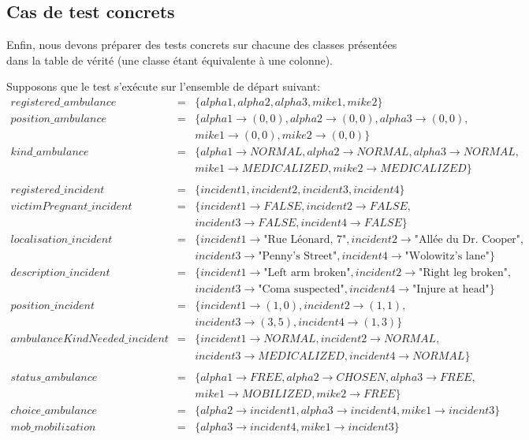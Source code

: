 \documentclass{report}
\begin{document}
\subsection{Cas de test concrets}

Enfin, nous devons préparer des tests concrets sur chacune des classes 
présentées dans la table de vérité (une classe étant équivalente à une
colonne).

Supposons que le test s'exécute sur l'ensemble de départ suivant:
\begin{eqnarray*}
registered\_ambulance &=& \{alpha1, alpha2, alpha3, mike1, mike2\}\\
position\_ambulance &=& \{alpha1 \rightarrow (0,0), alpha2 \rightarrow (0,0), alpha3 \rightarrow (0,0), \\ 
	&& mike1 \rightarrow (0,0), mike2 \rightarrow (0,0)\}\\
kind\_ambulance &=& \{alpha1 \rightarrow NORMAL, alpha2 \rightarrow NORMAL, alpha3 \rightarrow NORMAL, \\ 
	&& mike1 \rightarrow MEDICALIZED, mike2 \rightarrow MEDICALIZED\} \\
\\
registered\_incident &=& \{incident1, incident2, incident3, incident4\}\\
victimPregnant\_incident &=& \{incident1 \rightarrow FALSE, incident2\rightarrow FALSE, \\ 
	&& incident3\rightarrow FALSE, incident4\rightarrow FALSE\}\\
localisation\_incident &=& \{incident1 \rightarrow \text{"Rue Léonard, 7"}, incident2 \rightarrow \text{"Allée du Dr. Cooper"},\\ 
	&&  incident3  \rightarrow \text{"Penny's Street"}, incident4 \rightarrow \text{"Wolowitz's lane"}\}\\
description\_incident &=& \{incident1 \rightarrow \text{"Left arm broken"}, incident2 \rightarrow \text{"Right leg broken"},\\ 
	&&  incident3 \rightarrow \text{"Coma suspected"}, incident4 \rightarrow \text{"Injure at head"}\}\\
position\_incident &=& \{incident1 \rightarrow (1,0), incident2 \rightarrow (1,1),\\ 
	&&  incident3 \rightarrow (3,5), incident4 \rightarrow (1,3)\}\\
ambulanceKindNeeded\_incident &=& \{incident1 \rightarrow NORMAL, incident2 \rightarrow NORMAL, \\ 
	&& incident3 \rightarrow MEDICALIZED, incident4 \rightarrow NORMAL\}\\
\\
status\_ambulance &=& \{alpha1 \rightarrow FREE, alpha2 \rightarrow CHOSEN, alpha3 \rightarrow FREE, \\ 
	&& mike1 \rightarrow MOBILIZED, mike2 \rightarrow FREE\} \\
choice\_ambulance &=& \{alpha2 \rightarrow incident1, alpha3 \rightarrow incident4, mike1 \rightarrow incident3\} \\
mob\_mobilization &=& \{alpha3 \rightarrow incident4, mike1 \rightarrow incident3\} \\
\end{eqnarray*}
\end{document}
